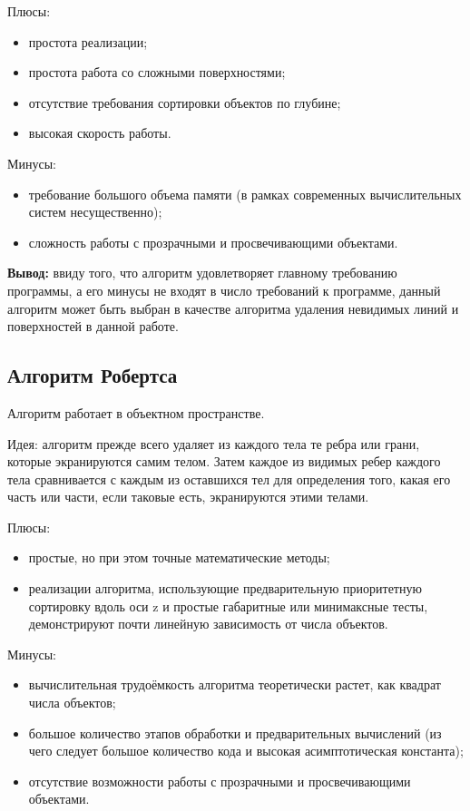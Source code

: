 Плюсы:
\begin{itemize}
    \item простота реализации;
    \item простота работа со сложными поверхностями;
    \item отсутствие требования сортировки объектов по глубине;
    \item высокая скорость работы.
\end{itemize}

Минусы:
\begin{itemize}
    \item требование большого объема памяти (в рамках современных вычислительных систем несущественно);
    \item сложность работы с прозрачными и просвечивающими объектами.
\end{itemize}

\textbf{Вывод:} ввиду того, что алгоритм удовлетворяет главному требованию программы, а его минусы не входят в число требований к программе, данный алгоритм может быть выбран в качестве алгоритма удаления невидимых линий и поверхностей в данной работе.

\subsection{Алгоритм Робертса}
Алгоритм работает в объектном пространстве. 

Идея: алгоритм прежде всего удаляет из каждого тела те ребра или грани, которые экранируются самим телом. Затем каждое из видимых ребер каждого тела сравнивается с каждым из оставшихся тел для определения того, какая его часть или части, если таковые есть, экранируются этими телами. 

Плюсы:
\begin{itemize}
    \item простые, но при этом точные математические методы;
    \item реализации алгоритма, использующие предварительную приоритетную сортировку вдоль оси z и простые габаритные или минимаксные тесты, демонстрируют почти линейную зависимость от числа объектов.
\end{itemize}

Минусы:
\begin{itemize}
    \item вычислительная трудоёмкость алгоритма теоретически растет, как квадрат числа объектов;
    \item большое количество этапов обработки и предварительных вычислений (из чего следует большое количество кода и высокая асимптотическая константа);
    \item отсутствие возможности работы с прозрачными и просвечивающими объектами.
\end{itemize}

